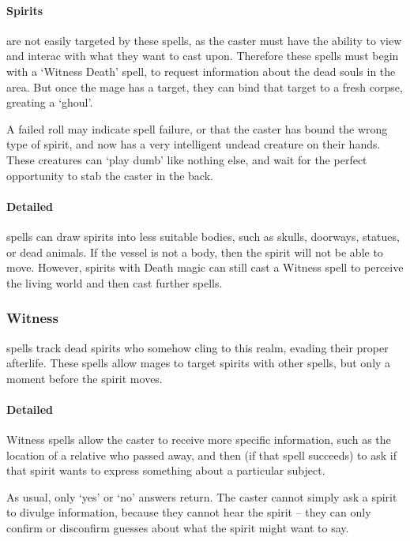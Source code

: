 \begin{multicols}{2}
\paragraph{Spirits}
    are not easily targeted by these spells, as the caster must have the ability to view and interac with what they want to cast upon.
    Therefore these spells must begin with a `Witness Death' spell, to request information about the dead souls in the area.
    But once the mage has a target, they can bind that target to a fresh corpse, greating a `ghoul'.

    A failed roll may indicate spell failure, or that the caster has bound the wrong type of spirit, and now has a very intelligent undead creature on their hands.
    These creatures can `play dumb' like nothing else, and wait for the perfect opportunity to stab the caster in the back.

\paragraph{Detailed}
spells can draw spirits into less suitable bodies, such as skulls, doorways, statues, or dead animals.
If the vessel is not a body, then the spirit will not be able to move.
However, spirits with Death magic can still cast a Witness spell to perceive the living world and then cast further spells.

\subsubsection{Witness}
spells track dead spirits who somehow cling to this realm, evading their proper afterlife.%
These spells allow mages to target spirits with other spells, but only a moment before the spirit moves.

\paragraph{Detailed}
Witness spells allow the caster to receive more specific information, such as the location of a relative who passed away, and then (if that spell succeeds) to ask if that spirit wants to express something about a particular subject.

As usual, only `yes' or `no' answers return.
The caster cannot simply ask a spirit to divulge information, because they cannot hear the spirit -- they can only confirm or disconfirm guesses about what the spirit might want to say.


\end{multicols}
